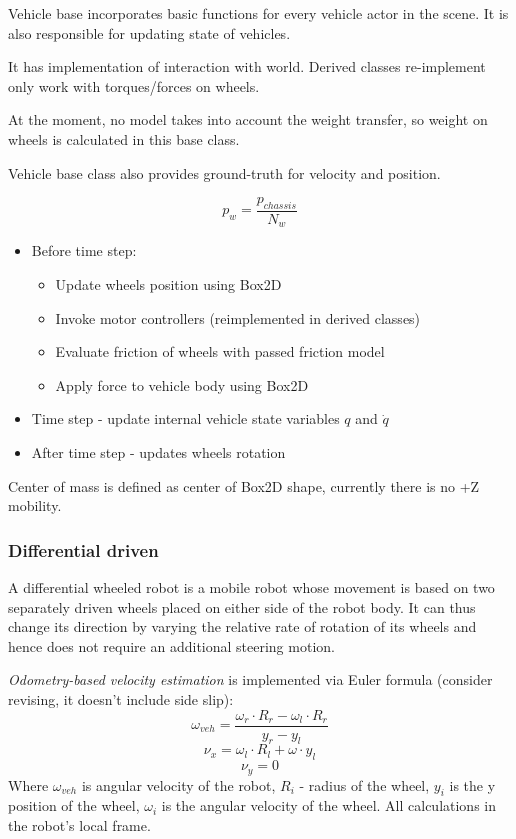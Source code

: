 \documentclass[a4paper,11pt]{article}
\begin{document}
Vehicle base incorporates basic functions for every vehicle actor in the scene. It is also responsible for updating state of vehicles.

It has implementation of interaction with world. Derived classes re-implement only work with torques/forces on wheels. 

At the moment, no model takes into account the weight transfer, so weight on wheels is calculated in this base class.

Vehicle base class also provides ground-truth for velocity and position. 
\begin{center}
\[
p_w = \frac{p_{chassis}}{N_w}
\]
\end{center}

\begin{itemize}
	\item Before time step:
	\begin{itemize}
		\item Update wheels position using Box2D
		\item Invoke motor controllers (reimplemented in derived classes)
		\item Evaluate friction of wheels with passed friction model
		\item Apply force to vehicle body using Box2D
	\end{itemize}
	\item Time step - update internal vehicle state variables $q$ and $\dot{q}$
	\item After time step - updates wheels rotation		
\end{itemize}

Center of mass is defined as center of Box2D shape, currently there is no +Z mobility. 
 
\subsubsection{Differential driven}

A differential wheeled robot is a mobile robot whose movement is based on two separately driven wheels placed on either side of the robot body. It can thus change its direction by varying the relative rate of rotation of its wheels and hence does not require an additional steering motion.

\textit{Odometry-based velocity estimation} is implemented via Euler formula (consider revising, it doesn't include side slip):
\[
\omega_{veh} = \frac{\omega_r \cdot R_r - \omega_l \cdot R_r}{y_r - y_l}
\]
\[
\nu_x = \omega_l \cdot R_l + \omega \cdot y_l
\]
\[
\nu_y = 0
\]
Where $\omega_{veh}$ is angular velocity of the robot, $R_i$ - radius of the wheel, $y_i$ is the y position of the wheel, $\omega_i$ is the angular velocity of the wheel. All calculations in the robot's local frame. 
\end{document}
